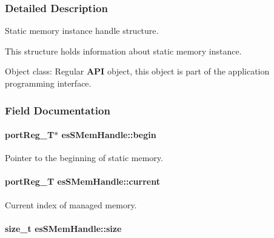 \subsubsection{Detailed Description}
Static memory instance handle structure. 

This structure holds information about static memory instance. \begin{DoxyParagraph}{Object class\-:}
Regular {\bfseries A\-P\-I} object, this object is part of the application programming interface. 
\end{DoxyParagraph}


\subsubsection{Field Documentation}
\hypertarget{structesSMemHandle_a01da81c99962c4e30bc5286a95e1c912}{
\paragraph[{begin}]{\setlength{\rightskip}{0pt plus 5cm}port\-Reg\-\_\-\-T$\ast$ es\-S\-Mem\-Handle\-::begin}}\label{structesSMemHandle_a01da81c99962c4e30bc5286a95e1c912}


Pointer to the beginning of static memory. 

\hypertarget{structesSMemHandle_a2ffccb4ce219c893b0de4bb277a4103d}{
\paragraph[{current}]{\setlength{\rightskip}{0pt plus 5cm}port\-Reg\-\_\-\-T es\-S\-Mem\-Handle\-::current}}\label{structesSMemHandle_a2ffccb4ce219c893b0de4bb277a4103d}


Current index of managed memory. 

\hypertarget{structesSMemHandle_a9f70491a315a88d0e01edc29e87da9b0}{
\paragraph[{size}]{\setlength{\rightskip}{0pt plus 5cm}size\-\_\-t es\-S\-Mem\-Handle\-::size}}\label{structesSMemHandle_a9f70491a315a88d0e01edc29e87da9b0}


